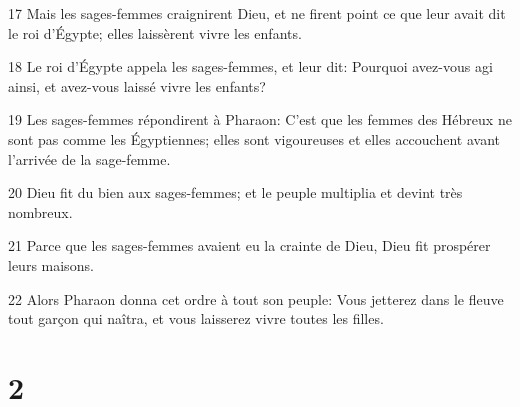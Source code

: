 \par 17 Mais les sages-femmes craignirent Dieu, et ne firent point ce que leur avait dit le roi d'Égypte; elles laissèrent vivre les enfants.
\par 18 Le roi d'Égypte appela les sages-femmes, et leur dit: Pourquoi avez-vous agi ainsi, et avez-vous laissé vivre les enfants?
\par 19 Les sages-femmes répondirent à Pharaon: C'est que les femmes des Hébreux ne sont pas comme les Égyptiennes; elles sont vigoureuses et elles accouchent avant l'arrivée de la sage-femme.
\par 20 Dieu fit du bien aux sages-femmes; et le peuple multiplia et devint très nombreux.
\par 21 Parce que les sages-femmes avaient eu la crainte de Dieu, Dieu fit prospérer leurs maisons.
\par 22 Alors Pharaon donna cet ordre à tout son peuple: Vous jetterez dans le fleuve tout garçon qui naîtra, et vous laisserez vivre toutes les filles.

\chapter{2}

